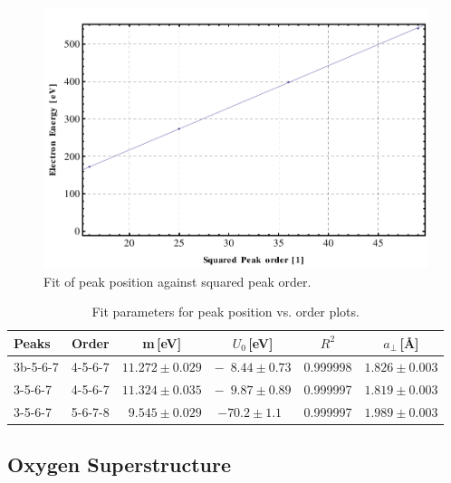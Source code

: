 \documentclass[a4paper,10pt]{scrartcl}
\begin{document}
\begin{figure}
\centering
\includegraphics[scale=0.55]{img/ivfit}
\caption{Fit of peak position against squared peak order. \label{fig:ivfit}}
\end{figure}

\begin{table}
\begin{center}
\begin{tabular}{lccccc}
\toprule
Peaks              & Order   & m\,[eV]                      & $U_{0}$\,[eV]               & $R^{2}$  & $a_{\perp}$\,[\AA]  \\
\midrule
3b-5-6-7           & 4-5-6-7 & $11.272 \pm 0.029$           & $-\phantom{0}8.44 \pm 0.73$ & 0.999998 & $1.826 \pm 0.003$ \\
\phantom{b}3-5-6-7 & 4-5-6-7 & $11.324 \pm 0.035$           & $-\phantom{0}9.87 \pm 0.89$ & 0.999997 & $1.819 \pm 0.003$ \\
\phantom{b}3-5-6-7 & 5-6-7-8 & $\phantom{0}9.545 \pm 0.029$ & $-70.2 \pm 1.1\phantom{0}$  & 0.999997 & $1.989 \pm 0.003$ \\
\bottomrule
\end{tabular}
\end{center}
\par
\caption{Fit parameters for peak position vs. order plots. \label{tab:ivfitparas}}
\end{table}


\subsection{Oxygen Superstructure}
\end{document}
